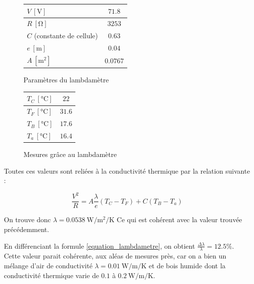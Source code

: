 \documentclass[../PS6_RapportFinal.tex]{subfiles}
\begin{document}
\begin{figure}[h]

\begin{minipage}[h]{8cm}
	\begin{center}
	\begin{tabular}{|l|c|}
		\hline 
		$V \: [\si{\volt}]$ & $\num{71.8}$ \\
		\hline 
		$R \: [\si{\ohm}]$ & $3253$ \\
		\hline 
		$C$ (constante de cellule) & $\num{0.63}$ \\
		\hline 
		$e \: [\si{\metre}]$ & $\num{0.04}$ \\
		\hline 
		$A \: [\si{\square\metre}]$ & $\num{0.0767}$ \\
		\hline
	\end{tabular}
	\label{parametres_lambdametre}
	\caption{Paramètres du lambdamètre}
	\end{center}
\end{minipage}
\hfill
\begin{minipage}[h]{6cm}
	\begin{center}
	\begin{tabular}{|l|c|}
		\hline 
		$T_{C} \: [\si{\degreeCelsius}]$ & $\num{22}$ \\
		\hline 
		$T_{F} \: [\si{\degreeCelsius}]$ & $\num{31.6}$ \\
		\hline 
		$T_{B} \: [\si{\degreeCelsius}]$ & $\num{17.6}$ \\
		\hline 
		$T_{a} \: [\si{\degreeCelsius}]$ & $\num{16.4}$\\
		\hline
	\end{tabular}
	\label{mesures_lambdametre}
	\caption{Mesures grâce au lambdamètre}
	\end{center}
\end{minipage}
\end{figure}

Toutes ces valeurs sont reliées à la conductivité thermique par la relation suivante :

\begin{equation}
\frac{V^{2}}{R} = A\frac{\lambda}{e}(T_{C}-T_{F})+C(T_{B}-T_{a})
\label{equation_lambdametre}
\end{equation}

On trouve donc $\lambda = \num{0.0538} \: \si{\watt\per\square\metre\per\kelvin}$
Ce qui est cohérent avec la valeur trouvée précédemment.



En différenciant la formule \ref{equation_lambdametre}, on obtient $\frac{\Delta \lambda}{\lambda} = \num{12.5} \%$.
Cette valeur parait cohérente, aux aléas de mesures près, car on a bien un mélange d'air de conductivité $\lambda = \num{0.01} \: \si{\watt\per\metre\per\kelvin}$ et de bois humide dont la conductivité thermique varie de $\num{0.1}$ à $\num{0.2} \: \si{\watt\per\metre\per\kelvin}$. 
\end{document}
